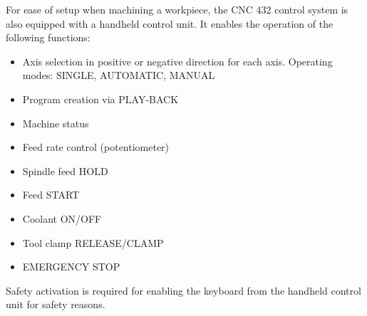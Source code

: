 \vspace{0.5cm}


\setcounter{page}{4}


\noindent
For ease of setup when machining a workpiece, the CNC 432 control system is also equipped with a handheld control unit. It enables the operation of the following functions:

\begin{itemize}[itemsep=1pt,parsep=0pt]
    \item Axis selection in positive or negative direction for each axis. Operating modes: SINGLE, AUTOMATIC, MANUAL
    \item Program creation via PLAY-BACK
    \item Machine status
    \item Feed rate control (potentiometer)
    \item Spindle feed HOLD
    \item Feed START
    \item Coolant ON/OFF
    \item Tool clamp RELEASE/CLAMP
    \item EMERGENCY STOP
\end{itemize}

\noindent
Safety activation is required for enabling the keyboard from the handheld control unit for safety reasons.

\vspace{0.3cm}


\vspace{0.3cm}


\vspace{-0.6cm}

\begin{center}
\end{center}

\vspace{-0.5cm}


